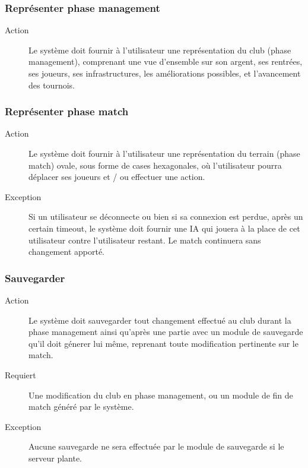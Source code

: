 \documentclass[a4paper]{article}
\begin{document}
\subsubsection{Représenter phase management}
\begin{description}
\item[Action] Le système doit fournir à l'\gls{utilisateur} une représentation du \gls{club} (phase management), comprenant une vue d'ensemble sur son argent, ses rentrées, ses \glspl{joueur}, ses infrastructures, les améliorations possibles, et l'avancement des tournois.
\end{description}

\subsubsection{Représenter phase match}
\begin{description}
\item[Action] Le système doit fournir à l'\gls{utilisateur} une représentation du terrain (phase match) ovale, sous forme de cases hexagonales, où l'\gls{utilisateur} pourra déplacer ses \glspl{joueur} et / ou effectuer une action.
\item[Exception] Si un \gls{utilisateur} se déconnecte ou bien si sa connexion est perdue, après un certain timeout, le système doit fournir une IA qui jouera à la place de cet \gls{utilisateur} contre l'\gls{utilisateur} restant. Le match continuera sans changement apporté.
\end{description}

\subsubsection{Sauvegarder}
\begin{description}
\item[Action] Le système doit sauvegarder tout changement effectué au \gls{club} durant la phase management ainsi qu'après une partie avec un module de sauvegarde qu'il doit génerer lui même, reprenant toute modification pertinente sur le match.
\item[Requiert] Une modification du \gls{club} en phase management, ou un module de fin de match généré par le système. 
\item[Exception] Aucune sauvegarde ne sera effectuée par le module de sauvegarde si le \gls{serveur} plante.
\end{description}
\end{document}
